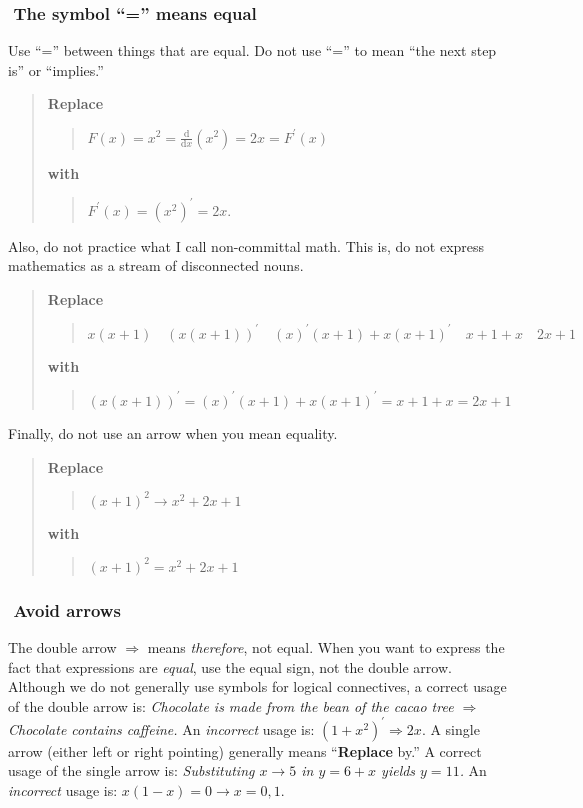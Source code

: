 \documentclass[12pt]{article}
\newcounter{ex}\setcounter{ex}{0}
\newcommand{\ex}{%
\hspace{-0.2in} \setcounter{ex}{\value{ex}+1}
\theex \,\,}
\newcounter{id}\setcounter{id}{0}
\newcounter{se}\setcounter{se}{0}
\begin{document}
\subsubsection*{\ex The symbol ``='' means equal}

Use ``='' between things that are equal. Do not use ``='' to 
mean ``the next step is'' or ``implies.''

\begin{quote}
\textbf{Replace}
\begin{quote}
  \(\displaystyle F(x) = x^2 = \frac{\mathrm{d}}{\mathrm{d} x} (x^2) = 2x = F^\prime(x)\)
\end{quote}
\textbf{with}
\begin{quote}
  \(F^\prime(x) = (x^2)^\prime = 2 x. \)
\end{quote}
\end{quote}

\noindent Also, do not practice what I call non-committal math. This is, do not
express mathematics as a stream of disconnected nouns.

\begin{quote}
\textbf{Replace}
\begin{quote}
  \( x (x + 1) \quad (x (x + 1))^\prime \quad (x)^\prime (x + 1) + x (x+1)^\prime
 \quad x + 1 + x \quad 2x + 1 \)
\end{quote}
\textbf{with}
\begin{quote}
   \((x (x + 1))^\prime = (x)^\prime (x + 1) + x (x+1)^\prime =  x + 1 + x = 2x + 1 \)
\end{quote}
\end{quote}

Finally, do not use an arrow when you mean equality.

\begin{quote}
\textbf{Replace}
\begin{quote}
  \( (x+1)^2 \rightarrow x^2 + 2 x + 1 \)
\end{quote}
\textbf{with}
\begin{quote}
   \( (x+1)^2 = x^2 + 2 x + 1 \)
\end{quote}
\end{quote}

\subsubsection*{\ex Avoid arrows}
The double arrow \(\Rightarrow\) means \emph{therefore}, not
equal. When you want to express the fact that expressions are
\emph{equal}, use the equal sign, not the double arrow. Although we do
not generally use symbols for logical connectives, a correct usage of
the double arrow is: \emph{Chocolate is made from the bean of the
cacao tree \(\Rightarrow\) Chocolate contains caffeine.}  An
\emph{incorrect} usage is: \(\left(1 + x^2\right)^\prime \Rightarrow 2
x\).  A single arrow (either left or right pointing) generally means
``\textbf{Replace} by.''  A correct usage of the single arrow is:
\emph{Substituting \(x \to 5\) in \(y = 6 + x\) yields \(y = 11\).} An
\emph{incorrect} usage is: \(x (1-x) = 0 \to x = 0,1\).
\end{document}
